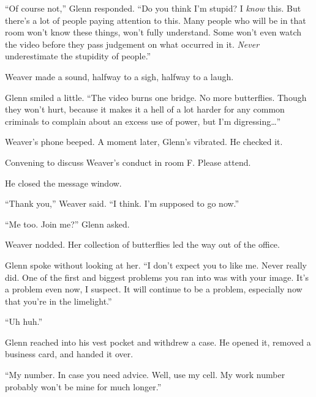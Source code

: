 ``Of course not,'' Glenn responded.  ``Do you think I'm stupid?  I \emph{know} this.  But there's a lot of people paying attention to this.  Many people who will be in that room won't know these things, won't fully understand.  Some won't even watch the video before they pass judgement on what occurred in it.  \emph{Never} underestimate the stupidity of people.''



Weaver made a sound, halfway to a sigh, halfway to a laugh.



Glenn smiled a little.  ``The video burns one bridge.  No more butterflies.  Though they won't hurt, because it makes it a hell of a lot harder for any common criminals to complain about an excess use of power, but I'm digressing\ldots''



Weaver's phone beeped.  A moment later, Glenn's vibrated.  He checked it.



Convening to discuss Weaver's conduct in room F.  Please attend.



He closed the message window.



``Thank you,'' Weaver said.  ``I think.  I'm supposed to go now.''



``Me too.  Join me?''  Glenn asked.



Weaver nodded.  Her collection of butterflies led the way out of the office.



Glenn spoke without looking at her.  ``I don't expect you to like me.  Never really did.  One of the first and biggest problems you ran into was with your image.  It's a problem even now, I suspect.  It will continue to be a problem, especially now that you're in the limelight.''



``Uh huh.''



Glenn reached into his vest pocket and withdrew a case.  He opened it, removed a business card, and handed it over.



``My number.  In case you need advice.  Well, use my cell.  My work number probably won't be mine for much longer.''



